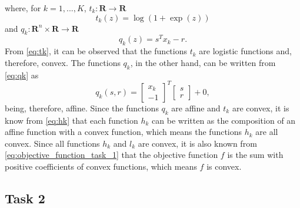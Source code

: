 \documentclass[12pt]{article}
\begin{document}
where, for $k=1,...,K$, $t_k: {\mathbf R} \rightarrow {\mathbf R}$
\begin{equation} \label{eq:tk}
    t_k(z) = \log(1+\exp(z))
\end{equation}
and $q_k: {\mathbf R}^n \times {\mathbf R} \rightarrow {\mathbf R}$
\begin{equation} \label{eq:qk}
    q_k(z) = s^T x_k - r.
\end{equation}
From \eqref{eq:tk}, it can be observed that the functions $t_k$ are logistic functions and, therefore, convex. The functions $q_k$, in the other hand, can be written from \eqref{eq:qk} as
\begin{equation*}
    q_k (s,r) =
    \begin{bmatrix}
    x_k \\
    -1
    \end{bmatrix}^T
    \begin{bmatrix}
    s \\
    r
    \end{bmatrix} + 0,
\end{equation*}
being, therefore, affine. Since the functions $q_k$ are affine and $t_k$ are convex, it is know from \eqref{eq:hk} that each function $h_k$ can be written as the composition of an affine function with a convex function, which means the functions $h_k$ are all convex. Since all functions $h_k$ and $l_k$ are convex, it is also known from \eqref{eq:objective_function_task_1} that the objective function $f$ is the sum with positive coefficients of convex functions, which means $f$ is convex.

\subsection{Task 2}
\end{document}
